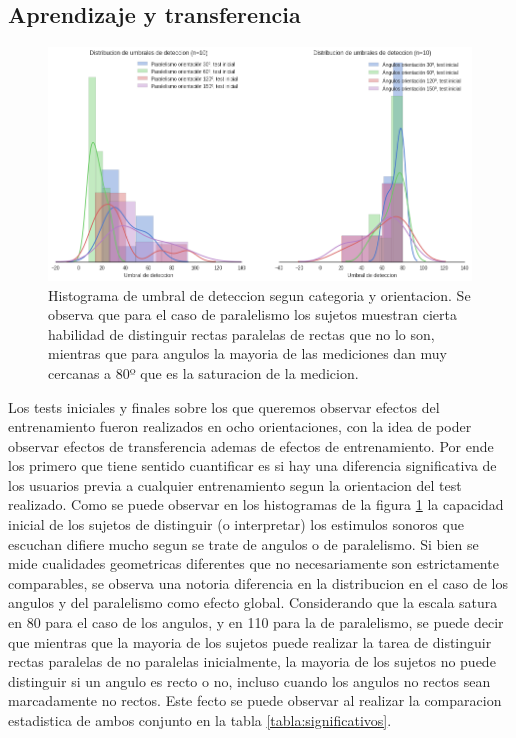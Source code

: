 \documentclass{article}
\begin{document}
\subsection{Aprendizaje y transferencia}

\begin{figure}
    \centering
    \includegraphics[width=\textwidth]{Imagenes/TransferenciaTestInicialHistogramasTotales.png}
    \caption{Histograma de umbral de deteccion segun categoria y orientacion. Se observa que para el caso de paralelismo los sujetos muestran cierta habilidad de distinguir rectas paralelas de rectas que no lo son, mientras que para angulos la mayoria de las mediciones dan muy cercanas a 80º que es la saturacion de la medicion.}
    \label{fig:histogramasTestInicial}
\end{figure}

Los tests iniciales y finales sobre los que queremos observar efectos del entrenamiento fueron realizados en ocho orientaciones, con la idea de poder observar efectos de transferencia ademas de efectos de entrenamiento. Por ende los primero que tiene sentido cuantificar es si hay una diferencia significativa de los usuarios previa a cualquier entrenamiento segun la orientacion del test realizado. Como se puede observar en los histogramas de la figura \ref{fig:histogramasTestInicial} la capacidad inicial de los sujetos de distinguir (o interpretar) los estimulos sonoros que escuchan difiere mucho segun se trate de angulos o de paralelismo. Si bien se mide cualidades geometricas diferentes que no necesariamente son estrictamente comparables, se observa una notoria diferencia en la distribucion en el caso de los angulos y del paralelismo como efecto global. Considerando que la escala satura en 80 para el caso de los angulos, y en 110 para la de paralelismo, se puede decir que mientras que la mayoria de los sujetos puede realizar la tarea de distinguir rectas paralelas de no paralelas inicialmente, la mayoria de los sujetos no puede distinguir si un angulo es recto o no, incluso cuando los angulos no rectos sean marcadamente no rectos. Este fecto se puede observar al realizar la comparacion estadistica de ambos conjunto en la tabla \ref{tabla:significativos}.
\end{document}
